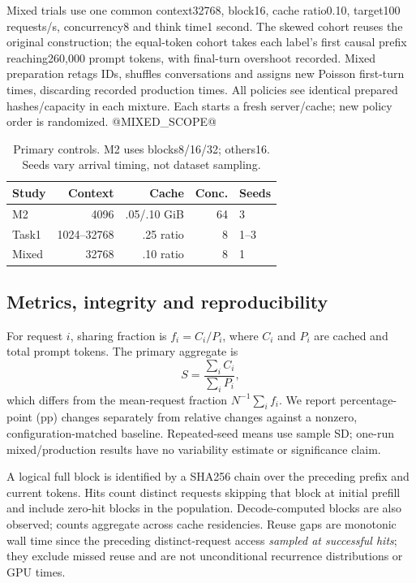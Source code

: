 \documentclass{article}
\begin{document}
Mixed trials use one common context32768, block16, cache ratio0.10, target100 requests/s, concurrency8 and think time1 second. The skewed cohort reuses the original construction; the equal-token cohort takes each label's first causal prefix reaching260,000 prompt tokens, with final-turn overshoot recorded. Mixed preparation retags IDs, shuffles conversations and assigns new Poisson first-turn times, discarding recorded production times. All policies see identical prepared hashes/capacity in each mixture. Each starts a fresh server/cache; new policy order is randomized. @MIXED_SCOPE@

\begin{table}[t]
\centering\small
\caption{Primary controls. M2 uses blocks8/16/32; others16. Seeds vary arrival timing, not dataset sampling.}
\begin{tabular}{lrrrl}\toprule
Study & Context & Cache & Conc. & Seeds\\\midrule
M2 & 4096 & .05/.10 GiB & 64 & 3\\
Task1 & 1024--32768 & .25 ratio & 8 & 1--3\\
Mixed & 32768 & .10 ratio & 8 & 1\\\bottomrule
\end{tabular}
\end{table}

\subsection{Metrics, integrity and reproducibility}
For request $i$, sharing fraction is $f_i=C_i/P_i$, where $C_i$ and $P_i$ are cached and total prompt tokens. The primary aggregate is
\begin{equation}
S=\frac{\sum_i C_i}{\sum_i P_i},
\end{equation}
which differs from the mean-request fraction $N^{-1}\sum_i f_i$. We report percentage-point (pp) changes separately from relative changes against a nonzero, configuration-matched baseline. Repeated-seed means use sample SD; one-run mixed/production results have no variability estimate or significance claim.

A logical full block is identified by a SHA256 chain over the preceding prefix and current tokens. Hits count distinct requests skipping that block at initial prefill and include zero-hit blocks in the population. Decode-computed blocks are also observed; counts aggregate across cache residencies. Reuse gaps are monotonic wall time since the preceding distinct-request access \emph{sampled at successful hits}; they exclude missed reuse and are not unconditional recurrence distributions or GPU times.
\end{document}
